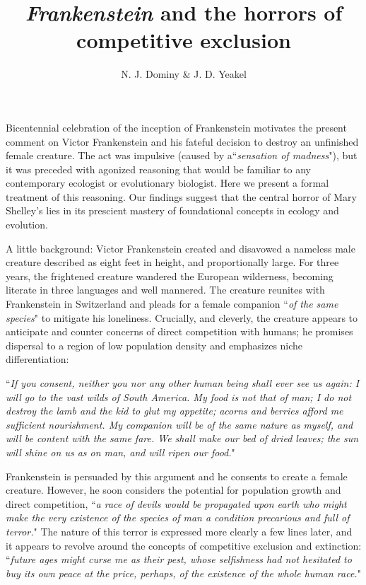 \documentclass{article}[10pt]
\begin{document}
\title{\emph{Frankenstein} and the horrors of competitive exclusion}


\author{N. J. Dominy \& J. D. Yeakel}

\date{}
%
%


\maketitle
\vspace{-1.5cm}
Bicentennial celebration of the inception of Frankenstein motivates the present comment on Victor Frankenstein and his fateful decision to destroy an unfinished female creature. 
The act was impulsive (caused by a``\emph{sensation of madness}"), but it was preceded with agonized reasoning that would be familiar to any contemporary ecologist or evolutionary biologist. 
Here we present a formal treatment of this reasoning. 
Our findings suggest that the central horror of Mary Shelley's lies in its prescient mastery of foundational concepts in ecology and evolution.



A little background: Victor Frankenstein created and disavowed a nameless male creature described as eight feet in height, and proportionally large. 
For three years, the frightened creature wandered the European wilderness, becoming literate in three languages and well mannered. 
The creature reunites with Frankenstein in Switzerland and pleads for a female companion ``\emph{of the same species}" to mitigate his loneliness. Crucially, and cleverly, the creature appears to anticipate and counter concerns of direct competition with humans; he promises dispersal to a region of low population density and emphasizes niche differentiation:


\begin{displayquote}
``\emph{If you consent, neither you nor any other human being shall ever see us again: I will go to the vast wilds of South America. My food is not that of man; I do not destroy the lamb and the kid to glut my appetite; acorns and berries afford me sufficient nourishment. My companion will be of the same nature as myself, and will be content with the same fare. We shall make our bed of dried leaves; the sun will shine on us as on man, and will ripen our food.}"
\end{displayquote}

Frankenstein is persuaded by this argument and he consents to create a female creature. 
However, he soon considers the potential for population growth and direct competition, ``\emph{a race of devils would be propagated upon earth who might make the very existence of the species of man a condition precarious and full of terror.}" 
The nature of this terror is expressed more clearly a few lines later, and it appears to revolve around the concepts of competitive exclusion and extinction: ``\emph{future ages might curse me as their pest, whose selfishness had not hesitated to buy its own peace at the price, perhaps, of the existence of the whole human race.}"
\end{document}
